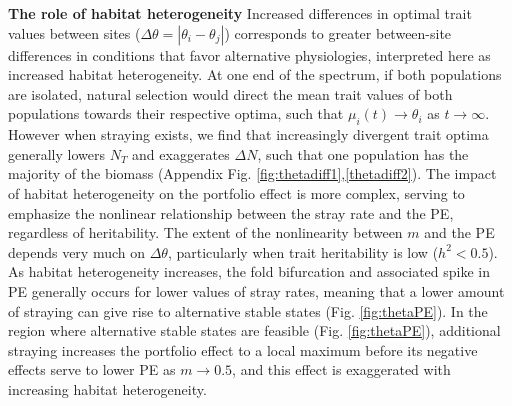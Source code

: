 \documentclass[twocolumn,preprintnumbers,amsmath,amssymb,superscriptaddress]{revtex4}
\begin{document}
{\bf The role of habitat heterogeneity} Increased differences in optimal trait values between sites ($\Delta\theta = \left|\theta_i - \theta_j\right|$) corresponds to greater between-site differences in conditions that favor alternative physiologies, interpreted here as increased habitat heterogeneity.
At one end of the spectrum, if both populations are isolated, natural selection would direct the mean trait values of both populations towards their respective optima, such that $\mu_i(t) \rightarrow \theta_i$ as $t\rightarrow\infty$.
However when straying exists, we find that increasingly divergent trait optima generally lowers $N_T$ and exaggerates $\Delta N$, such that one population has the majority of the biomass (Appendix Fig. \ref{fig:thetadiff1},\ref{thetadiff2}).
The impact of habitat heterogeneity on the portfolio effect is more complex, serving to emphasize the nonlinear relationship between the stray rate and the PE, regardless of heritability.
The extent of the nonlinearity between $m$ and the PE depends very much on $\Delta\theta$, particularly when trait heritability is low ($h^2<0.5$).
As habitat heterogeneity increases, the fold bifurcation and associated spike in PE generally occurs for lower values of stray rates, meaning that a lower amount of straying can give rise to alternative stable states (Fig. \ref{fig:thetaPE}).
In the region where alternative stable states are feasible (Fig. \ref{fig:thetaPE}), additional straying increases the portfolio effect to a local maximum before its negative effects serve to lower PE as $m\rightarrow 0.5$, and this effect is exaggerated with increasing habitat heterogeneity.






\end{document}
